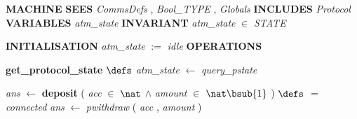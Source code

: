 %
\bsetindent
\begin{tabbing}
\bSetTabs
%
%
\bbnl
{\bf MACHINE} \bhsp{} \-\label{ATM}
%
%
\bbnl
{\bf SEES} \+ \bbnl
{\em CommsDefs\/}\label{CommsDefs}  , {\em Bool\_TYPE\/}\label{Bool_TYPE}  , {\em Globals\/}\label{Globals}  \-
%
%
\bbnl
{\bf INCLUDES} \+ \bbnl
{\em Protocol\/}\label{Protocol}  \-
%
%
\bbnl
{\bf VARIABLES} \+ \bbnl
{\em atm\_state\/}\label{atm_state}  \-
%
%
\bbnl
{\bf INVARIANT} \+ \bbnl
{\em atm\_state\/} $\in$ {\em STATE\/}\label{STATE}
\end{tabbing}
\bresetindent
%
%
\vspace{-4.5ex}\bsetindent
\begin{tabbing}
\bSetTabs
\+\> \-
%
%
\bbnl
{\bf INITIALISATION} \+ \bbnl
{\em atm\_state\/} $:=$  {\em idle\/} \-
%
%
\bnl\bnl
{\bf OPERATIONS} \+ \bbnl

%
%
{\bf { get\_protocol\_state}}  \bhsp $\defs$ \+ \bnl
{\em atm\_state\/} $\longleftarrow$ {\em query\_pstate\/}\label{query_pstate}  \- \bOperationSemiColon 
\end{tabbing}
\bresetindent
%
%
\vspace{-4.5ex}\bsetindent
\begin{tabbing}
\bSetTabs
\+\>
%
%
{\em ans\/} $\longleftarrow$  {\bf { deposit}} ( {\em acc\/} $\in$  $\nat$  $\wedge$
{\em amount\/} $\in$  $\nat\bsub{1}$  ) \bhsp $\defs$ \+ \bnl
   $=$ {\em connected\/} \- \bhsp {} \+\bnl
{\em ans\/} $\longleftarrow$ {\em pwithdraw\/}\label{pwithdraw}  ( {\em acc\/} , {\em amount\/} )  \-\bnl
{}  \- \bOperationSemiColon 
\end{tabbing}
